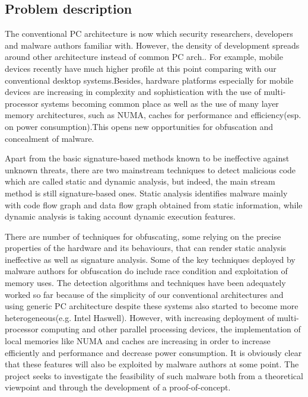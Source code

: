 \subsection{Problem description}
The conventional PC architecture is now which security researchers, developers and malware authors familiar with. However, the density of development spreads around other architecture instead of common PC arch.. For example, mobile devices recently have much higher profile at this point comparing with our conventional desktop systems.Besides, hardware platforms especially for mobile devices are increasing in complexity and sophistication with the use of multi-processor systems becoming common place as well as the use of many layer  memory architectures, such as NUMA, caches for performance and efficiency(esp. on power consumption).This opens new opportunities for obfuscation and concealment of malware.

Apart from the basic signature-based methods known to be ineffective against unknown threats, there are two mainstream techniques to detect malicious code which are called static and dynamic analysis, but indeed, the main stream method is still signature-based ones. Static analysis identifies malware mainly with code flow graph and data flow graph obtained from static information, while dynamic analysis is taking account dynamic execution features. 

There are number of techniques for obfuscating, some relying on the precise properties of the hardware and its behaviours, that can render static analysis ineffective as well as signature analysis. Some of the key techniques deployed by malware authors for obfuscation do include race condition and exploitation of memory uses. The detection algorithms and techniques have been adequately worked so far because of the simplicity of our conventional architectures and using generic PC architecture despite these systems also started to become more heterogeneous(e.g. Intel Haswell). However, with increasing deployment of multi-processor computing and other parallel processing devices, the implementation of local memories like NUMA and caches are increasing in order to increase efficiently and performance and decrease power consumption. It is obviously clear that these features will also be exploited by malware authors at some point. The project seeks to investigate the feasibility of such malware both from a theoretical viewpoint and through the development of a proof-of-concept.

